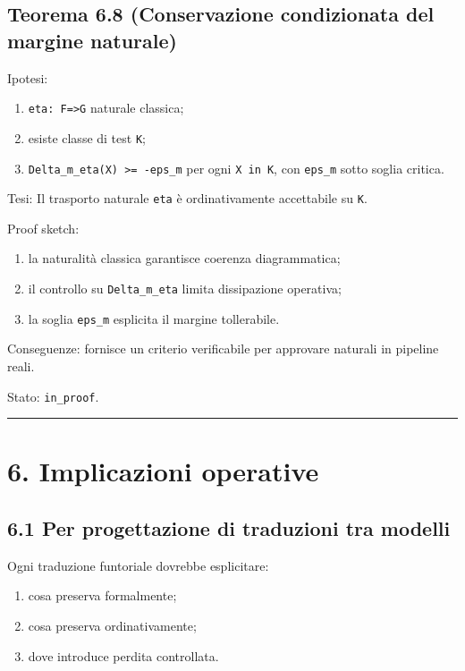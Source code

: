 \subsection{Teorema 6.8 (Conservazione condizionata del margine naturale)}

Ipotesi:

\begin{enumerate}
\def\labelenumi{\arabic{enumi}.}
\tightlist
\item
  \texttt{eta:\ F=\textgreater{}G} naturale classica;
\item
  esiste classe di test \texttt{K};
\item
  \texttt{Delta\_m\_eta(X)\ \textgreater{}=\ -eps\_m} per ogni \texttt{X\ in\ K}, con \texttt{eps\_m} sotto soglia critica.
\end{enumerate}

Tesi:
Il trasporto naturale \texttt{eta} è ordinativamente accettabile su \texttt{K}.

Proof sketch:

\begin{enumerate}
\def\labelenumi{\arabic{enumi}.}
\tightlist
\item
  la naturalità classica garantisce coerenza diagrammatica;
\item
  il controllo su \texttt{Delta\_m\_eta} limita dissipazione operativa;
\item
  la soglia \texttt{eps\_m} esplicita il margine tollerabile.
\end{enumerate}

Conseguenze:
fornisce un criterio verificabile per approvare naturali in pipeline reali.

Stato: \texttt{in\_proof}.

\begin{center}\rule{0.5\linewidth}{0.5pt}\end{center}

\section{6. Implicazioni operative}

\subsection{6.1 Per progettazione di traduzioni tra modelli}

Ogni traduzione funtoriale dovrebbe esplicitare:

\begin{enumerate}
\def\labelenumi{\arabic{enumi}.}
\tightlist
\item
  cosa preserva formalmente;
\item
  cosa preserva ordinativamente;
\item
  dove introduce perdita controllata.
\end{enumerate}

